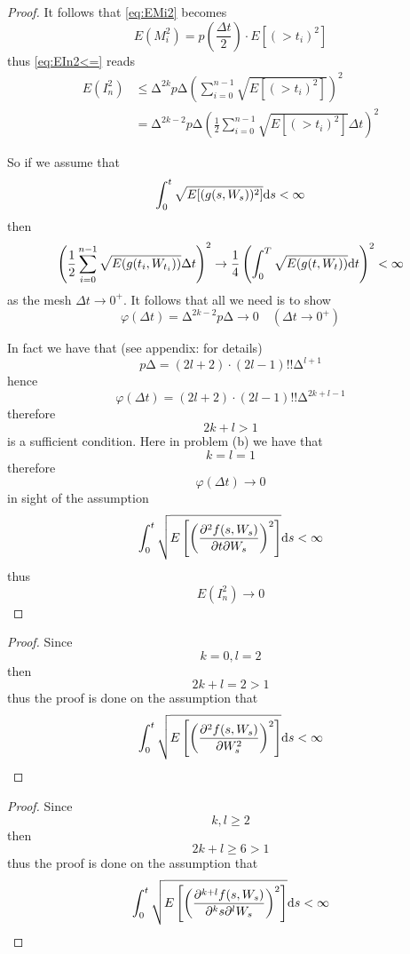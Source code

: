 \documentclass{homework}
\begin{document}
\begin{subproblem}[(\alph*)]
\begin{proof}
        It follows that \cref{eq:EMi2} becomes
        \[E(M_i^2)=p\left(\frac{\Delta t}{2}\right)
        \cdot E[(\gt{t_i})^2]\]
        thus \cref{eq:EIn2<=} reads
        \[\begin{aligned}
            E(I_n^2)&\leq
            \increment^{2k}p\increment\left(\sum_{i=0}^{n-1}
            \sqrt{E[(\gt{t_i})^2]}\right)^2\\
            &=\increment^{2k-2}p\increment
            \left(\frac12\sum_{i=0}^{n-1}\sqrt{E[(\gt{t_i})^2]}\Delta t\right)^2
        \end{aligned}\]

        So if we assume that
        \[\int_0^t\sqrt{E[(g(s,W_{s}))^2]}\mathrm d s<\infty\]
        then
        \[
            \left(\frac12\sum_{i=0}^{n-1}\sqrt{E(g(t_i,W_{t_i}))}\Delta t\right)^2
            \to
            \frac14\left(\int_0^T\sqrt{E(g(t,W_{t}))}\mathrm d t\right)^2
            <\infty
        \]
        as the mesh $\Delta t\to 0^+$.
        It follows that all we need is to show
        \[\varphi(\Delta t)=\increment^{2k-2}p\increment\to 0\quad(\Delta t\to 0^+)\]

        In fact we have that (see appendix:  for details)
        \[p\increment=(2l+2)\cdot(2l-1)!!\increment^{l+1}\]
        hence
        \[\varphi(\Delta t)
        =(2l+2)\cdot(2l-1)!!\increment^{2k+l-1}\]
        therefore
        \[2k+l>1\]
        is a sufficient condition.
        Here in problem (b) we have that
        \[k=l=1\]
        therefore
        \[\varphi(\Delta t)\to 0\]
        in sight of the assumption
        \[
            \int_0^t
            \sqrt{E\left[\left(\frac{\partial^2f(s,W_{s})}{\partial t\partial W_s}\right)^2\right]}
            \mathrm d s
            <\infty
        \]
        thus
        \[E(I_n^2)\to 0\]
        \end{proof}

        \item
        \begin{proof}
        Since
        \[k=0,l=2\]
        then
        \[2k+l=2>1\]
        thus the proof is done on the assumption that
        \[
            \int_0^t
            \sqrt{E\left[\left(\frac{\partial^2f(s,W_{s})}{\partial W_s^2}\right)^2\right]}
            \mathrm d s
            <\infty
        \]
        \end{proof}

        \item
        \begin{proof}
        Since
        \[k,l\geq 2\]
        then
        \[2k+l\geq 6>1\]
        thus the proof is done on the assumption that
        \[
            \int_0^t
            \sqrt{E\left[\left(\frac{\partial^{k+l}f(s,W_{s})}{\partial^k s\partial^l W_s}\right)^2\right]}
            \mathrm d s
            <\infty
        \]
        \end{proof}


    \end{subproblem}
\end{document}
